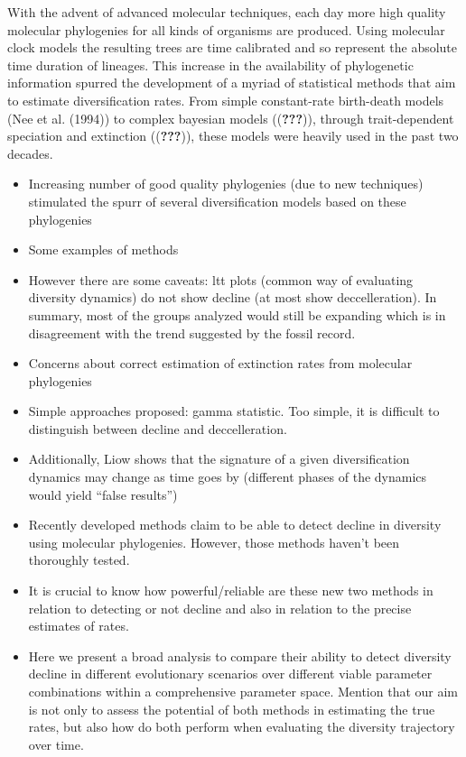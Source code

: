 \documentclass[11pt,]{article}
\begin{document}
With the advent of advanced molecular techniques, each day more high
quality molecular phylogenies for all kinds of organisms are produced.
Using molecular clock models the resulting trees are time calibrated and
so represent the absolute time duration of lineages. This increase in
the availability of phylogenetic information spurred the development of
a myriad of statistical methods that aim to estimate diversification
rates. From simple constant-rate birth-death models (Nee et al. (1994))
to complex bayesian models (({\textbf{???}})), through trait-dependent
speciation and extinction (({\textbf{???}})), these models were heavily
used in the past two decades.

\begin{itemize}
\item
  Increasing number of good quality phylogenies (due to new techniques)
  stimulated the spurr of several diversification models based on these
  phylogenies
\item
  Some examples of methods
\item
  However there are some caveats: ltt plots (common way of evaluating
  diversity dynamics) do not show decline (at most show deccelleration).
  In summary, most of the groups analyzed would still be expanding which
  is in disagreement with the trend suggested by the fossil record.
\item
  Concerns about correct estimation of extinction rates from molecular
  phylogenies
\item
  Simple approaches proposed: gamma statistic. Too simple, it is
  difficult to distinguish between decline and deccelleration.
\item
  Additionally, Liow shows that the signature of a given diversification
  dynamics may change as time goes by (different phases of the dynamics
  would yield ``false results'')
\item
  Recently developed methods claim to be able to detect decline in
  diversity using molecular phylogenies. However, those methods haven't
  been thoroughly tested.
\item
  It is crucial to know how powerful/reliable are these new two methods
  in relation to detecting or not decline and also in relation to the
  precise estimates of rates.
\item
  Here we present a broad analysis to compare their ability to detect
  diversity decline in different evolutionary scenarios over different
  viable parameter combinations within a comprehensive parameter space.
  Mention that our aim is not only to assess the potential of both
  methods in estimating the true rates, but also how do both perform
  when evaluating the diversity trajectory over time.
\end{itemize}
\end{document}
